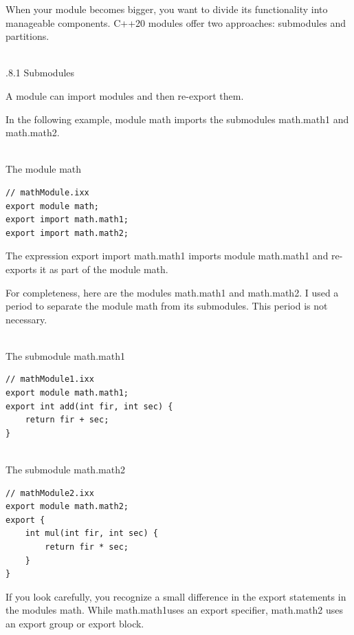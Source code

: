 
When your module becomes bigger, you want to divide its functionality into manageable components. C++20 modules offer two approaches: submodules and partitions.

\hspace*{\fill} \\ %
.8.1\hspace{0.2cm} Submodules

A module can import modules and then re-export them.

In the following example, module math imports the submodules math.math1 and math.math2.

\hspace*{\fill} \\ %
\noindent
The module math
\begin{lstlisting}[style=styleCXX]
// mathModule.ixx
export module math;
export import math.math1;
export import math.math2;
\end{lstlisting}

The expression export import math.math1 imports module math.math1 and re-exports it as part of the module math.

For completeness, here are the modules math.math1 and math.math2. I used a period to separate the module math from its submodules. This period is not necessary.

\hspace*{\fill} \\ %
\noindent
The submodule math.math1
\begin{lstlisting}[style=styleCXX]
// mathModule1.ixx
export module math.math1;
export int add(int fir, int sec) {
	return fir + sec;
}
\end{lstlisting}

\hspace*{\fill} \\ %
\noindent
The submodule math.math2
\begin{lstlisting}[style=styleCXX]
// mathModule2.ixx
export module math.math2;
export {
	int mul(int fir, int sec) {
		return fir * sec;
	}
}
\end{lstlisting}

If you look carefully, you recognize a small difference in the export statements in the modules math. While math.math1uses an export specifier, math.math2 uses an export group or export block.

